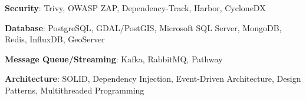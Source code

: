   \item{\textbf{Security}{: Trivy, OWASP ZAP, Dependency-Track, Harbor, CycloneDX}}
  \vspace{-10pt}
  \item{\textbf{Database}{: PostgreSQL, GDAL/PostGIS, Microsoft SQL Server, MongoDB, Redis, InfluxDB, GeoServer}}
  \vspace{-10pt}
  \item{\textbf{Message Queue/Streaming}{: Kafka, RabbitMQ, Pathway}}
  \vspace{-10pt}
  \item{\textbf{Architecture}{: SOLID, Dependency Injection, Event-Driven Architecture, Design Patterns, Multithreaded Programming}}
\resumeSubHeadingListEnd
